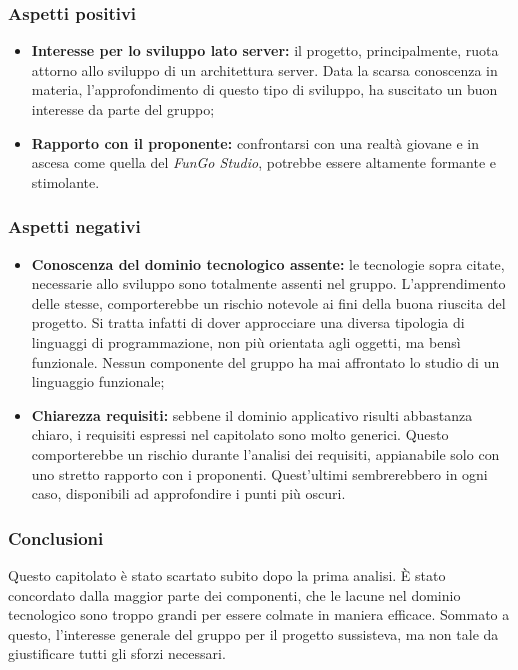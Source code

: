 \subsubsection{Aspetti positivi}
\label{aspettipos5}
\begin{itemize}
\item\textbf{Interesse per lo sviluppo lato server:} il progetto, principalmente, ruota attorno allo sviluppo di un architettura server. Data la scarsa conoscenza in materia, l'approfondimento di questo tipo di sviluppo, ha suscitato un buon interesse da parte del gruppo;
\item\textbf{Rapporto con il proponente:} confrontarsi con una realtà giovane e in ascesa come quella del \textit{FunGo Studio}, potrebbe essere altamente formante e stimolante. 
\end{itemize}

\subsubsection{Aspetti negativi}
\label{aspettineg5}
\begin{itemize}
\item\textbf{Conoscenza del dominio tecnologico assente:} le tecnologie sopra citate, necessarie allo sviluppo sono totalmente assenti nel gruppo. L'apprendimento delle stesse, comporterebbe un rischio notevole ai fini della buona riuscita del progetto. Si tratta infatti di dover approcciare una diversa tipologia di linguaggi di programmazione, non più orientata agli oggetti, ma bensì funzionale. Nessun componente del gruppo ha mai affrontato lo studio di un linguaggio funzionale;
\item\textbf{Chiarezza requisiti:} sebbene il dominio applicativo risulti abbastanza chiaro, i requisiti espressi nel capitolato sono molto generici. Questo comporterebbe un rischio durante l'analisi dei requisiti, appianabile solo con uno stretto rapporto con i proponenti. Quest'ultimi sembrerebbero in ogni caso, disponibili ad approfondire i punti più oscuri.
\end{itemize}

\subsubsection{Conclusioni}
\label{conclusioni5}
Questo capitolato è stato scartato subito dopo la prima analisi. \`E stato concordato dalla maggior parte dei componenti, che le lacune nel dominio tecnologico sono troppo grandi per essere colmate in maniera efficace. Sommato a questo, l'interesse generale del gruppo per il progetto sussisteva, ma non tale da giustificare tutti gli sforzi necessari.